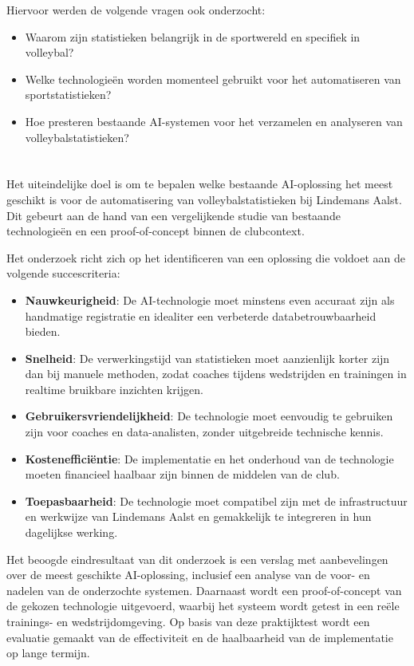 Hiervoor werden de volgende vragen ook onderzocht:
\begin{itemize}
    \item Waarom zijn statistieken belangrijk in de sportwereld en specifiek in volleybal?
    \item Welke technologieën worden momenteel gebruikt voor het automatiseren van sportstatistieken?
    \item Hoe presteren bestaande AI-systemen voor het verzamelen en analyseren van volleybalstatistieken?
\end{itemize}

\section{}%
\label{sec:onderzoeksdoelstelling}

Het uiteindelijke doel is om te bepalen welke bestaande AI-oplossing het meest geschikt is voor de automatisering van volleybalstatistieken bij Lindemans Aalst. Dit gebeurt aan de hand van een vergelijkende studie van bestaande technologieën en een proof-of-concept binnen de clubcontext.

Het onderzoek richt zich op het identificeren van een oplossing die voldoet aan de volgende succescriteria:
\begin{itemize}
  \item \textbf{Nauwkeurigheid}: De AI-technologie moet minstens even accuraat zijn als handmatige registratie en idealiter een verbeterde databetrouwbaarheid bieden.
  \item \textbf{Snelheid}: De verwerkingstijd van statistieken moet aanzienlijk korter zijn dan bij manuele methoden, zodat coaches tijdens wedstrijden en trainingen in realtime bruikbare inzichten krijgen.
  \item \textbf{Gebruikersvriendelijkheid}: De technologie moet eenvoudig te gebruiken zijn voor coaches en data-analisten, zonder uitgebreide technische kennis.
  \item \textbf{Kostenefficiëntie}: De implementatie en het onderhoud van de technologie moeten financieel haalbaar zijn binnen de middelen van de club.
  \item \textbf{Toepasbaarheid}: De technologie moet compatibel zijn met de infrastructuur en werkwijze van Lindemans Aalst en gemakkelijk te integreren in hun dagelijkse werking.
\end{itemize}

Het beoogde eindresultaat van dit onderzoek is een verslag met aanbevelingen over de meest geschikte AI-oplossing, inclusief een analyse van de voor- en nadelen van de onderzochte systemen. Daarnaast wordt een proof-of-concept van de gekozen technologie uitgevoerd, waarbij het systeem wordt getest in een reële trainings- en wedstrijdomgeving. Op basis van deze praktijktest wordt een evaluatie gemaakt van de effectiviteit en de haalbaarheid van de implementatie op lange termijn.

